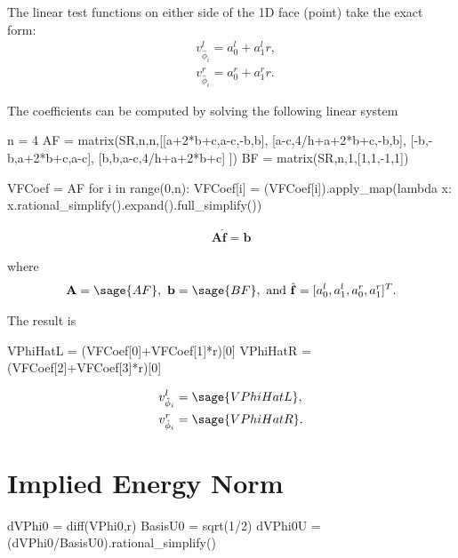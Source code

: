 \documentclass{article}
\numberwithin{equation}{section}
\newcommand{\vect}[1]{\mathbf{{#1}}}
\newcommand{\mat}[1]{\mathbf{{#1}}}
\begin{document}
The linear test functions on either side of the 1D face (point) take the exact form:
\begin{align}
& v_{\hat{\phi}_i}^l = a_0^l + a_1^l r,\\
& v_{\hat{\phi}_i}^r = a_0^r + a_1^r r.
\end{align}

The coefficients can be computed by solving the following linear system

\begin{sagesilent}
n = 4
AF = matrix(SR,n,n,[[a+2*b+c,a-c,-b,b],
                    [a-c,4/h+a+2*b+c,-b,b],
                    [-b,-b,a+2*b+c,a-c],
                    [b,b,a-c,4/h+a+2*b+c]
                   ])
BF = matrix(SR,n,1,[1,1,-1,1])

VFCoef = AF\BF
for i in range(0,n):
    VFCoef[i] = (VFCoef[i]).apply_map(lambda x: x.rational_simplify().expand().full_simplify())
\end{sagesilent}

\begin{align}
\mat{A} \hat{\vect{f}} = \vect{b}
\end{align}

where
\begin{align}
\mat{A} = \sage{AF},\ \vect{b} = \sage{BF},\ \text{and}\ \hat{\vect{f}} = [a_0^l,a_1^l,a_0^r,a_1^r]^T.
\end{align}

The result is
\begin{sagesilent}
VPhiHatL = (VFCoef[0]+VFCoef[1]*r)[0]
VPhiHatR = (VFCoef[2]+VFCoef[3]*r)[0]
\end{sagesilent}

\begin{align}
& v_{\hat{\phi}_i}^l = \sage{VPhiHatL}, \\
& v_{\hat{\phi}_i}^r = \sage{VPhiHatR}.
\end{align}


\section{Implied Energy Norm}
\begin{sagesilent}
dVPhi0 = diff(VPhi0,r)
BasisU0 = sqrt(1/2)
dVPhi0U = (dVPhi0/BasisU0).rational_simplify()
\end{sagesilent}
\end{document}
